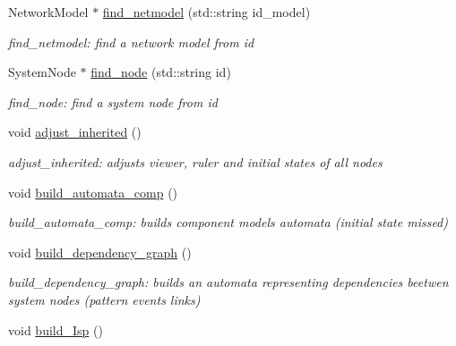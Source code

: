 \begin{DoxyCompactItemize}
Network\+Model $\ast$ \hyperlink{classspec__driver_aa301f786c511e059a45e5d340d18ac5b}{find\+\_\+netmodel} (std\+::string id\+\_\+model)
\begin{DoxyCompactList}\small\item\em find\+\_\+netmodel\+: find a network model from id \end{DoxyCompactList}\item 
System\+Node $\ast$ \hyperlink{classspec__driver_acb67929d0cd4f576f9fd264667a815b6}{find\+\_\+node} (std\+::string id)
\begin{DoxyCompactList}\small\item\em find\+\_\+node\+: find a system node from id \end{DoxyCompactList}\item 
void \hyperlink{classspec__driver_ab3950645bdc391613ed3e55f18783312}{adjust\+\_\+inherited} ()\hypertarget{classspec__driver_ab3950645bdc391613ed3e55f18783312}{}\label{classspec__driver_ab3950645bdc391613ed3e55f18783312}

\begin{DoxyCompactList}\small\item\em adjust\+\_\+inherited\+: adjusts viewer, ruler and initial states of all nodes \end{DoxyCompactList}\item 
void \hyperlink{classspec__driver_ab1232c0107789885cb253aed227df43e}{build\+\_\+automata\+\_\+comp} ()\hypertarget{classspec__driver_ab1232c0107789885cb253aed227df43e}{}\label{classspec__driver_ab1232c0107789885cb253aed227df43e}

\begin{DoxyCompactList}\small\item\em build\+\_\+automata\+\_\+comp\+: builds component models automata (initial state missed) \end{DoxyCompactList}\item 
void \hyperlink{classspec__driver_a419a6aec9dffd43f3f0a7969a3fbb6b1}{build\+\_\+dependency\+\_\+graph} ()\hypertarget{classspec__driver_a419a6aec9dffd43f3f0a7969a3fbb6b1}{}\label{classspec__driver_a419a6aec9dffd43f3f0a7969a3fbb6b1}

\begin{DoxyCompactList}\small\item\em build\+\_\+dependency\+\_\+graph\+: builds an automata representing dependencies beetwen system nodes (pattern events links) \end{DoxyCompactList}\item 
void \hyperlink{classspec__driver_a6ebc152f1570fadb0c7a229132b1140f}{build\+\_\+\+Isp} ()\hypertarget{classspec__driver_a6ebc152f1570fadb0c7a229132b1140f}{}\label{classspec__driver_a6ebc152f1570fadb0c7a229132b1140f}


\end{DoxyCompactItemize}

